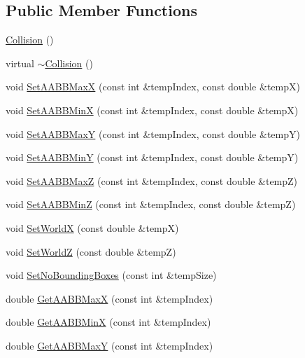 \subsection*{Public Member Functions}
\begin{DoxyCompactItemize}
\item 
\hyperlink{class_collision_aea8004fbf48b79b5db7b784688b23788}{Collision} ()
\item 
virtual \hyperlink{class_collision_a81d1b669d7a8b03b178e794168ba7cec}{$\sim$\+Collision} ()
\item 
void \hyperlink{class_collision_a4a48bb981450043e0acf28a94ba374cc}{Set\+A\+A\+B\+B\+MaxX} (const int \&temp\+Index, const double \&tempX)
\item 
void \hyperlink{class_collision_ad66b32a512b0960655b5ccdbbf801040}{Set\+A\+A\+B\+B\+MinX} (const int \&temp\+Index, const double \&tempX)
\item 
void \hyperlink{class_collision_a35e483cf3deffa4be09fed5784fe9b70}{Set\+A\+A\+B\+B\+MaxY} (const int \&temp\+Index, const double \&tempY)
\item 
void \hyperlink{class_collision_a2fc1f4a0be6b09684b7b79afc943a385}{Set\+A\+A\+B\+B\+MinY} (const int \&temp\+Index, const double \&tempY)
\item 
void \hyperlink{class_collision_a9b6fe54f1dda6499340ac58c5ffb6a77}{Set\+A\+A\+B\+B\+MaxZ} (const int \&temp\+Index, const double \&tempZ)
\item 
void \hyperlink{class_collision_ab77ba9725bc8b756345869e96cfc3228}{Set\+A\+A\+B\+B\+MinZ} (const int \&temp\+Index, const double \&tempZ)
\item 
void \hyperlink{class_collision_af053c5af75487ad9562a936ec8e6a158}{Set\+WorldX} (const double \&tempX)
\item 
void \hyperlink{class_collision_a6f39869c9da8a8860d01b7f8091ea0af}{Set\+WorldZ} (const double \&tempZ)
\item 
void \hyperlink{class_collision_a33c7681e88ca6ab89ae53b6342aed6f2}{Set\+No\+Bounding\+Boxes} (const int \&temp\+Size)
\item 
double \hyperlink{class_collision_a54a4c7409f13ac040768d41422e796de}{Get\+A\+A\+B\+B\+MaxX} (const int \&temp\+Index)
\item 
double \hyperlink{class_collision_a5cf3d3f10e3f24128a6b410c5a34ffa7}{Get\+A\+A\+B\+B\+MinX} (const int \&temp\+Index)
\item 
double \hyperlink{class_collision_aa3dcbca1a59ada6f1140ce68ffaf4e24}{Get\+A\+A\+B\+B\+MaxY} (const int \&temp\+Index)
\item 

\end{DoxyCompactItemize}

